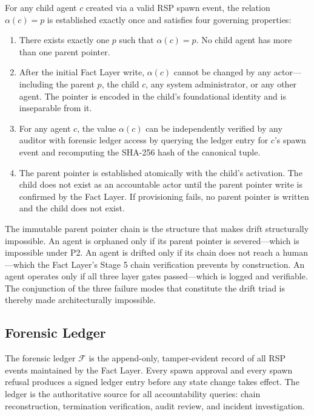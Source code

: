 For any child agent $c$ created via a valid RSP spawn event, the relation $\alpha(c) = p$ is established exactly once and satisfies four governing properties:

\begin{enumerate}
    \item[\textbf{P1 — Uniqueness.}] There exists exactly one $p$ such that $\alpha(c) = p$. No child agent has more than one parent pointer.
    \item[\textbf{P2 — Immutability.}] After the initial Fact Layer write, $\alpha(c)$ cannot be changed by any actor—including the parent $p$, the child $c$, any system administrator, or any other agent. The pointer is encoded in the child's foundational identity and is inseparable from it.
    \item[\textbf{P3 — Verifiability.}] For any agent $c$, the value $\alpha(c)$ can be independently verified by any auditor with forensic ledger access by querying the ledger entry for $c$'s spawn event and recomputing the SHA-256 hash of the canonical tuple.
    \item[\textbf{P4 — Non-repudiation.}] The parent pointer is established atomically with the child's activation. The child does not exist as an accountable actor until the parent pointer write is confirmed by the Fact Layer. If provisioning fails, no parent pointer is written and the child does not exist.
\end{enumerate}

The immutable parent pointer chain is the structure that makes drift structurally impossible. An agent is orphaned only if its parent pointer is severed—which is impossible under P2. An agent is drifted only if its chain does not reach a human—which the Fact Layer's Stage 5 chain verification prevents by construction. An agent operates only if all three layer gates passed—which is logged and verifiable. The conjunction of the three failure modes that constitute the drift triad is thereby made architecturally impossible.

\subsection{Forensic Ledger}

The forensic ledger $\mathcal{F}$ is the append-only, tamper-evident record of all RSP events maintained by the Fact Layer. Every spawn approval and every spawn refusal produces a signed ledger entry before any state change takes effect. The ledger is the authoritative source for all accountability queries: chain reconstruction, termination verification, audit review, and incident investigation.

